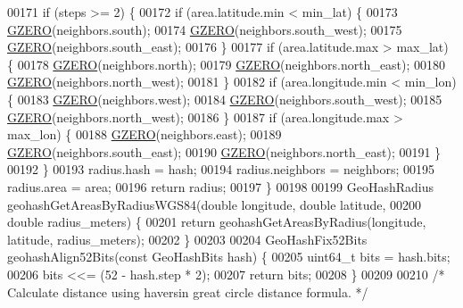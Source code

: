 \begin{DoxyCode}
00171     \textcolor{keywordflow}{if} (steps >= 2) \{
00172         \textcolor{keywordflow}{if} (area.latitude.min < min\_lat) \{
00173             \hyperlink{geohash__helper_8h_a0ac998d4746216b3a6730185529fe567}{GZERO}(neighbors.south);
00174             \hyperlink{geohash__helper_8h_a0ac998d4746216b3a6730185529fe567}{GZERO}(neighbors.south\_west);
00175             \hyperlink{geohash__helper_8h_a0ac998d4746216b3a6730185529fe567}{GZERO}(neighbors.south\_east);
00176         \}
00177         \textcolor{keywordflow}{if} (area.latitude.max > max\_lat) \{
00178             \hyperlink{geohash__helper_8h_a0ac998d4746216b3a6730185529fe567}{GZERO}(neighbors.north);
00179             \hyperlink{geohash__helper_8h_a0ac998d4746216b3a6730185529fe567}{GZERO}(neighbors.north\_east);
00180             \hyperlink{geohash__helper_8h_a0ac998d4746216b3a6730185529fe567}{GZERO}(neighbors.north\_west);
00181         \}
00182         \textcolor{keywordflow}{if} (area.longitude.min < min\_lon) \{
00183             \hyperlink{geohash__helper_8h_a0ac998d4746216b3a6730185529fe567}{GZERO}(neighbors.west);
00184             \hyperlink{geohash__helper_8h_a0ac998d4746216b3a6730185529fe567}{GZERO}(neighbors.south\_west);
00185             \hyperlink{geohash__helper_8h_a0ac998d4746216b3a6730185529fe567}{GZERO}(neighbors.north\_west);
00186         \}
00187         \textcolor{keywordflow}{if} (area.longitude.max > max\_lon) \{
00188             \hyperlink{geohash__helper_8h_a0ac998d4746216b3a6730185529fe567}{GZERO}(neighbors.east);
00189             \hyperlink{geohash__helper_8h_a0ac998d4746216b3a6730185529fe567}{GZERO}(neighbors.south\_east);
00190             \hyperlink{geohash__helper_8h_a0ac998d4746216b3a6730185529fe567}{GZERO}(neighbors.north\_east);
00191         \}
00192     \}
00193     radius.hash = hash;
00194     radius.neighbors = neighbors;
00195     radius.area = area;
00196     \textcolor{keywordflow}{return} radius;
00197 \}
00198 
00199 GeoHashRadius geohashGetAreasByRadiusWGS84(\textcolor{keywordtype}{double} longitude, \textcolor{keywordtype}{double} latitude,
00200                                            \textcolor{keywordtype}{double} radius\_meters) \{
00201     \textcolor{keywordflow}{return} geohashGetAreasByRadius(longitude, latitude, radius\_meters);
00202 \}
00203 
00204 GeoHashFix52Bits geohashAlign52Bits(\textcolor{keyword}{const} GeoHashBits hash) \{
00205     uint64\_t bits = hash.bits;
00206     bits <<= (52 - hash.step * 2);
00207     \textcolor{keywordflow}{return} bits;
00208 \}
00209 
00210 \textcolor{comment}{/* Calculate distance using haversin great circle distance formula. */}

\end{DoxyCode}
